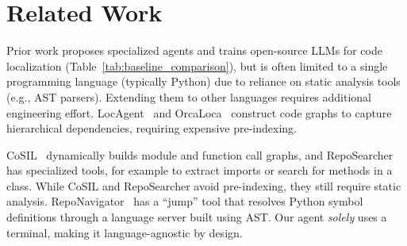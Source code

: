 \section{Related Work}
\label{sec:background}
Prior work proposes specialized agents and trains open-source LLMs for code localization (Table~\ref{tab:baseline_comparison}), but is often limited to a single programming language (typically Python) due to reliance on static analysis tools (e.g., AST parsers). Extending them to other languages requires additional engineering effort. LocAgent~\citep{chen-etal-2025-locagent} and OrcaLoca~\citep{ yu2025orcalocallmagentframework} construct code graphs to capture hierarchical dependencies, requiring expensive pre-indexing.
\begin{table}
    \centering
    \caption{Comparison of code localization methods. \methodname is the only method that directly post-trains LLMs with RL using a programming language-agnostic scaffold equipped \emph{solely} with a bash terminal.}
    \label{tab:baseline_comparison}
    \vspace{-7pt}
\end{table}
CoSIL~\citep{jiang2025issuelocalizationllmdriveniterative} dynamically builds module and function call graphs, and RepoSearcher~\citep{ma2025toolintegratedreinforcementlearningrepo} has specialized tools, for example to extract imports or search for methods in a class. While CoSIL and RepoSearcher avoid pre-indexing, they still require static analysis. RepoNavigator~\citep{zhang2025one} has a ``jump'' tool that resolves Python symbol definitions through a language server built using AST. Our agent \emph{solely} uses a terminal, making it language-agnostic by design.

